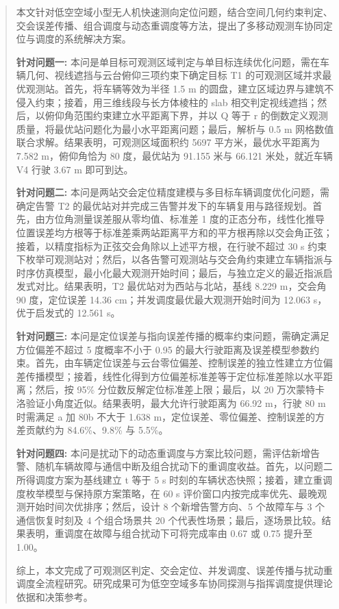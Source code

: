 \begin{abstract}

本文针对低空空域小型无人机快速测向定位问题，结合空间几何约束判定、交会误差传播、组合调度与动态重调度等方法，提出了多移动观测车协同定位与调度的系统解决方案。

\textbf{针对问题一:} 本问是单目标可观测区域判定与单目标连续优化问题，需在车辆几何、视线遮挡与云台俯仰三项约束下确定目标 T1 的可观测区域并求最优观测站。首先，将车辆等效为半径 1.5 m 的圆盘，建立区域边界与建筑不侵入约束；接着，用三维线段与长方体棱柱的 slab 相交判定视线遮挡；然后，以俯仰角范围约束建立水平距离下界，并以 Q 等于 r 的倒数定义观测质量，将最优站问题化为最小水平距离问题；最后，解析与 0.5 m 网格数值联合求解。结果表明，可观测区域面积约 5697 平方米，最优水平距离为 7.582 m，俯仰角恰为 80 度，最优站为 91.155 米与 66.121 米处，就近车辆 V4 行驶 3.67 m 即可到达。

\textbf{针对问题二:} 本问是两站交会定位精度建模与多目标车辆调度优化问题，需确定告警 T2 的最优站对并完成三告警并发下的车辆复用与路径规划。首先，由方位角测量误差服从零均值、标准差 1 度的正态分布，线性化推导位置误差均方根等于标准差乘两站距离平方和的平方根再除以交会角正弦；接着，以精度指标为正弦交会角除以上述平方根，在行驶不超过 30 s 约束下枚举可观测站对；然后，以各告警可观测站与交会角约束建立车辆指派与时序仿真模型，最小化最大观测开始时间；最后，与独立定义的最近指派启发式对比。结果表明，T2 最优站对为西站与北站，基线 8.229 m，交会角 90 度，定位误差 14.36 cm；并发调度最优最大观测开始时间为 12.063 s，优于启发式的 12.561 s。

\textbf{针对问题三:} 本问是定位误差与指向误差传播的概率约束问题，需确定满足方位偏差不超过 5 度概率不小于 0.95 的最大行驶距离及误差模型参数约束。首先，由车辆定位误差与云台零位偏差、控制误差的独立性建立方位偏差传播模型；接着，线性化得到方位偏差标准差等于定位标准差除以水平距离；然后，按 95\% 分位数反解定位标准差上限；最后，以 20 万次蒙特卡洛验证小角度近似。结果表明，最大允许行驶距离为 66.92 m，行驶 80 m 时需满足 a 加 80b 不大于 1.638 m，定位误差、零位偏差、控制误差的方差贡献约为 84.6\%、9.8\% 与 5.5\%。

\textbf{针对问题四:} 本问是扰动下的动态重调度与方案比较问题，需评估新增告警、随机车辆故障与通信中断及组合扰动下的重调度收益。首先，以问题二所得调度方案为基线建立 t 等于 5 s 时刻的车辆状态快照；接着，建立重调度枚举模型与保持原方案策略，在 60 s 评价窗口内按完成率优先、最晚观测开始时间次优排序；然后，设计 8 个新增告警方向、5 个故障车与 3 个通信恢复时刻及 4 个组合场景共 20 个代表性场景；最后，逐场景比较。结果表明，重调度在故障与组合扰动下可将完成率由 0.67 或 0.75 提升至 1.00。

综上，本文完成了可观测区判定、交会定位、并发调度、误差传播与扰动重调度全流程研究。研究成果可为低空空域多车协同探测与指挥调度提供理论依据和决策参考。


\end{abstract}
